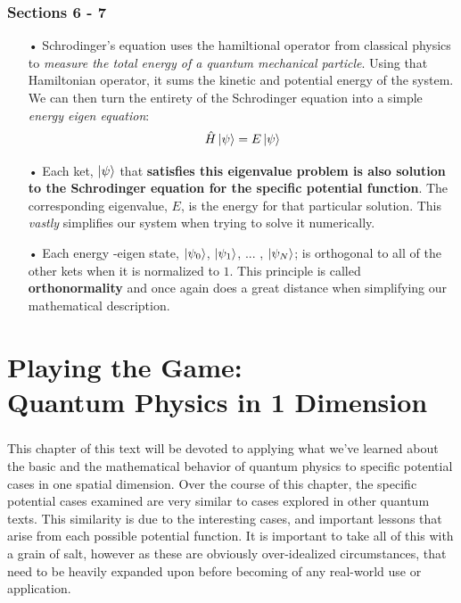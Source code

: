 \documentclass[12pt,letterpaper]{book}
\begin{document}
\subsection*{Sections 6 - 7}
\begin{enumerate}
\item[•]Schrodinger's equation uses the hamiltional operator from classical physics to \textit{measure the total energy of a quantum mechanical particle}. Using that Hamiltonian operator, it sums the kinetic and potential energy of the system. We can then turn the entirety of the Schrodinger equation into a simple \textit{energy eigen equation}:
\begin{equation}
\hat{H}\ket{\psi} = E\ket{\psi}
\end{equation}
\item[•]Each ket, $\ket{\psi}$ that \textbf{satisfies this eigenvalue problem is also solution to the Schrodinger equation for the specific potential function}. The corresponding eigenvalue, $E$, is the energy for that particular solution. This \textit{vastly} simplifies our system when trying to solve it numerically.
\item[•]Each energy -eigen state, $\ket{\psi_0}$, $\ket{\psi_1}$, ... , $\ket{\psi_N}$; is orthogonal to all of the other kets when it is normalized to $1$. This principle is called \textbf{orthonormality} and once again does a great distance when simplifying our mathematical description.
\end{enumerate}








\chapter{Playing the Game: \\ Quantum Physics in 1 Dimension}


\paragraph*{}This chapter of this text will be devoted to applying what we've learned about the basic and the mathematical behavior of quantum physics to specific potential cases in one spatial dimension. Over the course of this chapter, the specific potential cases examined are very similar to cases explored in other quantum texts. This similarity is due to the interesting cases, and important lessons that arise from each possible potential function. It is important to take all of this with a grain of salt, however as these are obviously over-idealized circumstances, that need to be heavily expanded upon before becoming of any real-world use or application.
\end{document}
